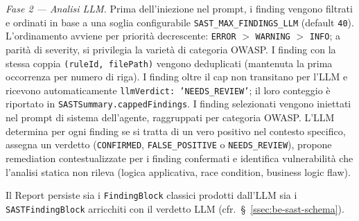 \documentclass[11pt,a4paper]{article}
\begin{document}
\emph{Fase 2 --- Analisi LLM.} Prima dell'iniezione nel prompt, i finding vengono filtrati e ordinati in base a una soglia configurabile \texttt{SAST\_MAX\_FINDINGS\_LLM} (default \texttt{40}). L'ordinamento avviene per priorità decrescente: \texttt{ERROR} $>$ \texttt{WARNING} $>$ \texttt{INFO}; a parità di severity, si privilegia la varietà di categoria OWASP. I finding con la stessa coppia \texttt{(ruleId, filePath)} vengono deduplicati (mantenuta la prima occorrenza per numero di riga). I finding oltre il cap non transitano per l'LLM e ricevono automaticamente \texttt{llmVerdict: 'NEEDS\_REVIEW'}; il loro conteggio è riportato in \texttt{SASTSummary.cappedFindings}. I finding selezionati vengono iniettati nel prompt di sistema dell'agente, raggruppati per categoria OWASP. L'LLM determina per ogni finding se si tratta di un vero positivo nel contesto specifico, assegna un verdetto (\texttt{CONFIRMED}, \texttt{FALSE\_POSITIVE} o \texttt{NEEDS\_REVIEW}), propone remediation contestualizzate per i finding confermati e identifica vulnerabilità che l'analisi statica non rileva (logica applicativa, race condition, business logic flaw).

\medskip
\noindent Il Report persiste sia i \texttt{FindingBlock} classici prodotti dall'LLM sia i \texttt{SASTFindingBlock} arricchiti con il verdetto LLM (cfr.~\S~\ref{ssec:be-sast-schema}).
\end{document}

